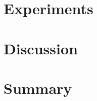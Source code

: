 \documentclass[11pt]{llncs}
\begin{document}
\section{Experiments}
\label{sec:org347db7c}

\section{Discussion}
\label{sec:orga3d6260}

\section{Summary}
\label{sec:orgc71dbe7}



\printbibliography
\end{document}
